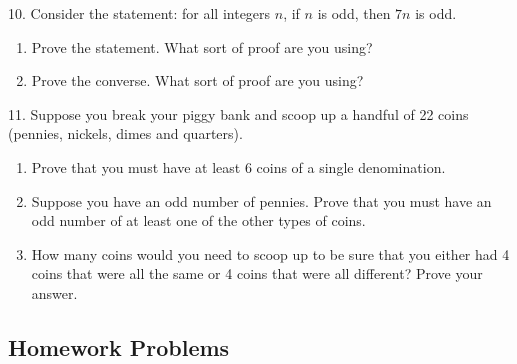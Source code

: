 \documentclass[10pt,]{book}
\theoremstyle{plain}
\theoremstyle{definition}
\theoremstyle{definition}
\theoremstyle{definition}
\numberwithin{equation}{chapter}
\begin{document}
\begin{exerciselist}
\par\smallskip
\item[10.]\hypertarget{exercise-253}{}
            Consider the statement: for all integers \(n\), if \(n\) is odd, then \(7n\) is odd.
\leavevmode%
\begin{enumerate}[label=(\alph*)]
\item\hypertarget{li-1171}{}
                Prove the statement. What sort of proof are you using?
\item\hypertarget{li-1172}{}
                Prove the converse. What sort of proof are you using?
\end{enumerate}
\par\smallskip
\item[11.]\hypertarget{exercise-254}{}
            Suppose you break your piggy bank and scoop up a handful of 22 coins (pennies, nickels, dimes and quarters).
\leavevmode%
\begin{enumerate}[label=(\alph*)]
\item\hypertarget{li-1175}{}
                Prove that you must have at least 6 coins of a single denomination.
\item\hypertarget{li-1176}{}
                Suppose you have an odd number of pennies. Prove that you must have an odd number of at least one of the other types of coins.
\item\hypertarget{li-1177}{}
                How many coins would you need to scoop up to be sure that you either had 4 coins that were all the same or 4 coins that were all different? Prove your answer.
\end{enumerate}
\par\smallskip
\end{exerciselist}
\typeout{************************************************}
\typeout{************************************************}
\subsection[Homework Problems]{Homework Problems}\label{exercises-24}
\end{document}
